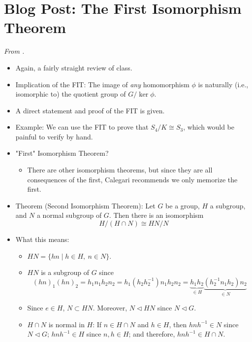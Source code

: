 \documentclass[../notes.tex]{subfiles}
\begin{document}
\section{Blog Post: The First Isomorphism Theorem}
\emph{From \textcite{bib:Calegari}.}
\begin{itemize}
    \item {}Again, a fairly straight review of class.
    \item Implication of the FIT: The image of \emph{any} homomorphism $\phi$ is naturally (i.e., isomorphic to) the quotient group of $G/\ker\phi$.
    \item A direct statement and proof of the FIT is given.
    \item Example: We can use the FIT to prove that $S_4/K\cong S_3$, which would be painful to verify by hand.
    \item "First" Isomorphism Theorem?
    \begin{itemize}
        \item There are other isomorphism theorems, but since they are all consequences of the first, Calegari recommends we only memorize the first.
    \end{itemize}
    \item Theorem (Second Isomorphism Theorem): Let $G$ be a group, $H$ a subgroup, and $N$ a normal subgroup of $G$. Then there is an isomorphism
    \begin{equation*}
        H/(H\cap N) \cong HN/N
    \end{equation*}
    \item What this means:
    \begin{itemize}
        \item $HN=\{hn\mid h\in H,\ n\in N\}$.
        \item $HN$ is a subgroup of $G$ since
        \begin{equation*}
            (hn)_1(hn)_2 = h_1n_1h_2n_2
            = h_1(h_2h_2^{-1})n_1h_2n_2
            = \underbrace{h_1h_2}_{\in H}\underbrace{(h_2^{-1}n_1h_2)n_2}_{\in N}
        \end{equation*}
        \item Since $e\in H$, $N\subset HN$. Moreover, $N\triangleleft HN$ since $N\triangleleft G$.
        \item $H\cap N$ is normal in $H$: If $n\in H\cap N$ and $h\in H$, then $hnh^{-1}\in N$ since $N\triangleleft G$; $hnh^{-1}\in H$ since $n,h\in H$; and therefore, $hnh^{-1}\in H\cap N$.
    \end{itemize}

\end{itemize}
\end{document}
